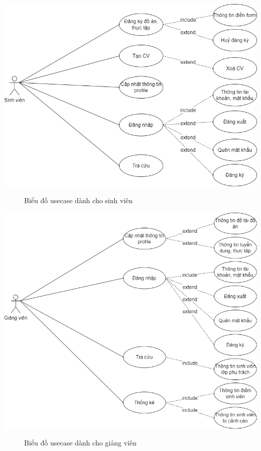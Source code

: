     \begin{center}
      \includegraphics[width=.9\textwidth]{../drawio/usecase33.png}
      \begin{figure}[h]
        \centering
        \caption{Biểu đồ usecase dành cho sinh viên}
      \end{figure}
    \end{center}
    \begin{center}
      \includegraphics[width=.9\textwidth]{../drawio/usecase44.png}
      \begin{figure}[h]
        \centering
        \caption{Biểu đồ usecase dành cho giảng viên}
      \end{figure}
    \end{center}
